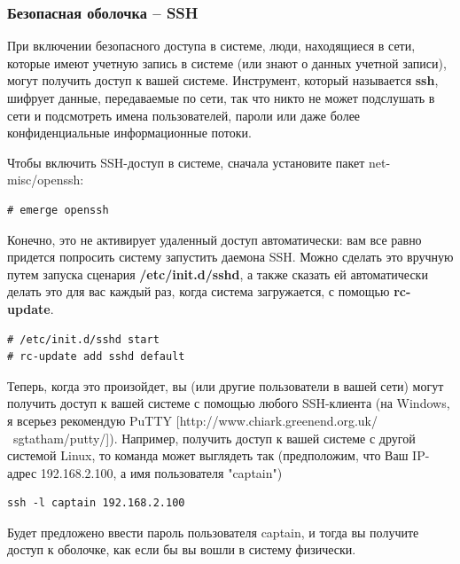 \documentclass[10pt]{book}
\begin{document}
\subsubsection{Безопасная оболочка -- SSH}

При включении безопасного доступа в системе, люди, находящиеся в сети, которые имеют учетную запись в системе (или знают о данных учетной записи), могут получить доступ к вашей системе. Инструмент, который называется \textbf{ssh}, шифрует данные, передаваемые по сети, так что никто не может подслушать в сети и подсмотреть имена пользователей, пароли или даже более конфиденциальные информационные потоки.

Чтобы включить SSH-доступ в системе, сначала установите пакет net-misc/openssh:

\begin{tcolorbox}
\begin{lstlisting}
# emerge openssh
\end{lstlisting}
\end{tcolorbox}

Конечно, это не активирует удаленный доступ автоматически: вам все равно придется попросить систему запустить даемона SSH. Можно сделать это вручную путем запуска сценария \textbf{/etc/init.d/sshd}, а также сказать ей автоматически делать это для вас каждый раз, когда система загружается, с помощью \textbf{rc-update}.

\begin{tcolorbox}
\begin{lstlisting}
# /etc/init.d/sshd start
# rc-update add sshd default
\end{lstlisting}
\end{tcolorbox}

Теперь, когда это произойдет, вы (или другие пользователи в вашей сети) могут получить доступ к вашей системе с помощью любого SSH-клиента (на Windows, я всерьез рекомендую PuTTY [http://www.chiark.greenend.org.uk/ ~sgtatham/putty/]). Например, получить доступ к вашей системе с другой системой Linux, то команда может выглядеть так (предположим, что Ваш IP-адрес 192.168.2.100, а имя пользователя "captain")

\begin{tcolorbox}
\begin{lstlisting}
ssh -l captain 192.168.2.100
\end{lstlisting}
\end{tcolorbox}
Будет предложено ввести пароль пользователя captain, и тогда вы получите доступ к оболочке, как если бы вы вошли в систему физически.
\end{document}
